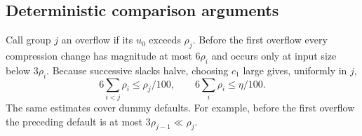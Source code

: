 \subsection{Deterministic comparison arguments}

Call group $j$ an overflow if its $u_0$ exceeds $\rho_j$.  Before the first
overflow every compression change has magnitude at most $6\rho_i$ and
occurs only at input size below $3\rho_i$.  Because successive slacks
halve, choosing $c_1$ large gives, uniformly in $j$,
\begin{equation}
 6\sum_{i<j}\rho_i\leq\rho_j/100,
 \qquad 6\sum_i\rho_i\leq\eta/100.
 \label{eq:buf-small-floors}
\end{equation}
The same estimates cover dummy defaults.  For example, before the first
overflow the preceding default is at most $3\rho_{j-1}\ll\rho_j$.

